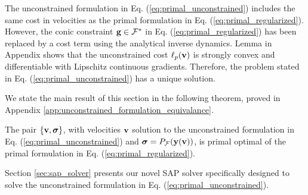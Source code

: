 The unconstrained formulation in Eq. (\ref{eq:primal_unconstrained}) includes
the same cost in velocities as the primal formulation in Eq.
(\ref{eq:primal_regularized}). However, the conic constraint ${\mathbf{g}}\in
\mathcal{F}^*$ in Eq. (\ref{eq:primal_regularized}) has been replaced by a cost
term using the analytical inverse dynamics. Lemma
 in Appendix  shows
that the unconstrained cost $\ell_p({\mathbf{v}})$ is strongly convex and
differentiable with Lipschitz continuous gradients. Therefore, the problem
stated in Eq. (\ref{eq:primal_unconstrained}) has a unique solution.

We state the main result of this section in the following theorem, proved in
Appendix \ref{app:unconstrained_formulation_equivalance}.
\begin{theorem}
    The pair $\{{\mathbf{v}},{\bm\sigma}\}$, with velocities ${\mathbf{v}}$ solution to the
    unconstrained formulation in Eq. (\ref{eq:primal_unconstrained}) and
    ${\bm\sigma}=P_\mathcal{F}({\mathbf{y}}({\mathbf{v}}))$, is primal optimal of the primal
    formulation in Eq. (\ref{eq:primal_regularized}).
    \label{th:unconstrained_formulation_equivalance}
\end{theorem}

Section \ref{sec:sap_solver} presents our novel SAP solver specifically designed
to solve the unconstrained formulation in Eq. (\ref{eq:primal_unconstrained}).
